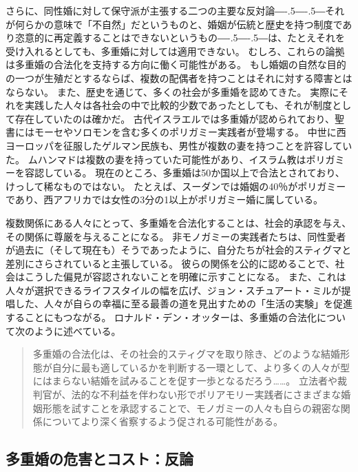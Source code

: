 \documentclass[paper=a4,book,openany]{jlreq}
\def\DDASH{―\kern-.5\zw―\kern-.5\zw―} %
\begin{document}
さらに、同性婚に対して保守派が主張する二つの主要な反対論{\DDASH}それが何らかの意味で「不自然」だというものと、婚姻が伝統と歴史を持つ制度であり恣意的に再定義することはできないというもの{\DDASH}は、たとえそれを受け入れるとしても、多重婚に対しては適用できない。
むしろ、これらの論拠は多重婚の合法化を支持する方向に働く可能性がある。
もし婚姻の自然な目的の一つが生殖だとするならば、複数の配偶者を持つことはそれに対する障害とはならない。
また、歴史を通じて、多くの社会が多重婚を認めてきた。
実際にそれを実践した人々は各社会の中で比較的少数であったとしても、それが制度として存在していたのは確かだ。
古代イスラエルでは多重婚が認められており、聖書にはモーセやソロモンを含む多くのポリガミー実践者が登場する。
中世に西ヨーロッパを征服したゲルマン民族も、男性が複数の妻を持つことを許容していた。
ムハンマドは複数の妻を持っていた可能性があり、イスラム教はポリガミーを容認している。
現在のところ、多重婚は50か国以上で合法とされており、けっして稀なものではない。
たとえば、スーダンでは婚姻の40％がポリガミーであり、西アフリカでは女性の3分の1以上がポリガミー婚に属している\citep{economist17:_link_between_polyg_war,dalton14:_why_is_polyg_more_preval_wester_afric}。

複数関係にある人々にとって、多重婚を合法化することは、社会的承認を与え、その関係に尊厳を与えることになる。
非モノガミーの実践者たちは、同性愛者が過去に（そして現在も）そうであったように、自分たちが社会的スティグマと差別にさらされていると主張している。
彼らの関係を公的に認めることで、社会はこうした偏見が容認されないことを明確に示すことになる。
また、これは人々が選択できるライフスタイルの幅を広げ、ジョン・スチュアート・ミルが提唱した、人々が自らの幸福に至る最善の道を見出すための「生活の実験」を促進することにもつながる\citep[p.57]{mill89:_liber_other_writin}。
ロナルド・デン・オッターは、多重婚の合法化について次のように述べている。

\begin{quote}
多重婚の合法化は、その社会的スティグマを取り除き、どのような結婚形態が自分に最も適しているかを判断する一環として、より多くの人々が型にはまらない結婚を試みることを促す一歩となるだろう……。
立法者や裁判官が、法的な不利益を伴わない形でポリアモリー実践者にさまざまな婚姻形態を試すことを承認することで、モノガミーの人々も自らの親密な関係についてより深く省察するよう促される可能性がある。
\citep{otter18:_perfec_argum_legal_recog_polyam_relat}
\end{quote}

\subsection{多重婚の危害とコスト：反論}
\end{document}
